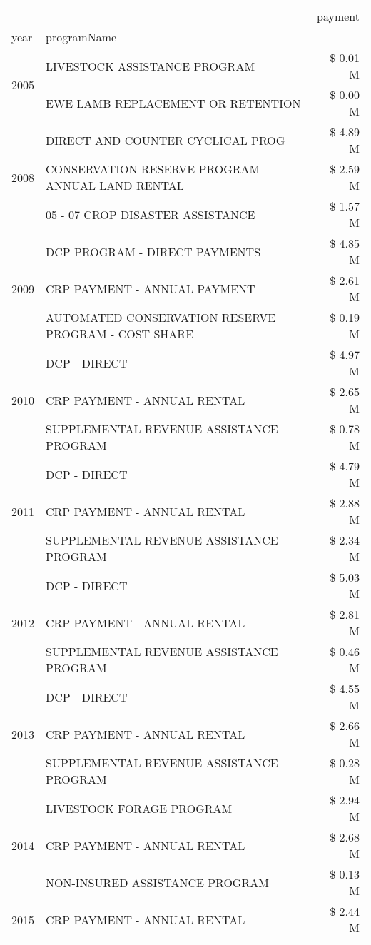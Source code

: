 \begin{tabular}{llr}
\toprule
 &  & payment \\
year & programName &  \\
\midrule
\multirow[t]{2}{*}{2005} & LIVESTOCK ASSISTANCE PROGRAM & \$ 0.01 M \\
 & EWE LAMB REPLACEMENT OR RETENTION & \$ 0.00 M \\
\cline{1-3}
\multirow[t]{3}{*}{2008} & DIRECT AND COUNTER CYCLICAL PROG & \$ 4.89 M \\
 & CONSERVATION RESERVE PROGRAM - ANNUAL LAND RENTAL & \$ 2.59 M \\
 & 05 - 07 CROP DISASTER ASSISTANCE & \$ 1.57 M \\
\cline{1-3}
\multirow[t]{3}{*}{2009} & DCP PROGRAM - DIRECT PAYMENTS & \$ 4.85 M \\
 & CRP PAYMENT - ANNUAL PAYMENT & \$ 2.61 M \\
 & AUTOMATED CONSERVATION RESERVE PROGRAM - COST SHARE & \$ 0.19 M \\
\cline{1-3}
\multirow[t]{3}{*}{2010} & DCP - DIRECT & \$ 4.97 M \\
 & CRP PAYMENT - ANNUAL RENTAL & \$ 2.65 M \\
 & SUPPLEMENTAL REVENUE ASSISTANCE PROGRAM & \$ 0.78 M \\
\cline{1-3}
\multirow[t]{3}{*}{2011} & DCP - DIRECT & \$ 4.79 M \\
 & CRP PAYMENT - ANNUAL RENTAL & \$ 2.88 M \\
 & SUPPLEMENTAL REVENUE ASSISTANCE PROGRAM & \$ 2.34 M \\
\cline{1-3}
\multirow[t]{3}{*}{2012} & DCP - DIRECT & \$ 5.03 M \\
 & CRP PAYMENT - ANNUAL RENTAL & \$ 2.81 M \\
 & SUPPLEMENTAL REVENUE ASSISTANCE PROGRAM & \$ 0.46 M \\
\cline{1-3}
\multirow[t]{3}{*}{2013} & DCP - DIRECT & \$ 4.55 M \\
 & CRP PAYMENT - ANNUAL RENTAL & \$ 2.66 M \\
 & SUPPLEMENTAL REVENUE ASSISTANCE PROGRAM & \$ 0.28 M \\
\cline{1-3}
\multirow[t]{3}{*}{2014} & LIVESTOCK FORAGE PROGRAM & \$ 2.94 M \\
 & CRP PAYMENT - ANNUAL RENTAL & \$ 2.68 M \\
 & NON-INSURED ASSISTANCE PROGRAM & \$ 0.13 M \\
\cline{1-3}
\multirow[t]{3}{*}{2015} & CRP PAYMENT - ANNUAL RENTAL & \$ 2.44 M \\

\end{tabular}
